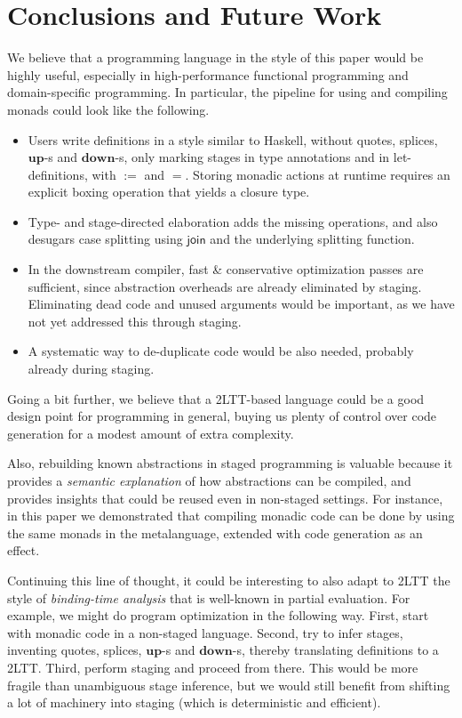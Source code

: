 \documentclass[acmsmall,screen]{acmart}
\newcommand{\mit}[1]{{\mathsf{#1}}}
\newcommand{\mbf}[1]{{\mathbf{#1}}}
\theoremstyle{remark}
\newcommand{\mup}{\mbf{up}}
\newcommand{\mdown}{\mbf{down}}
\newcommand{\join}{\mit{join}}
\begin{document}
\section{Conclusions and Future Work}

We believe that a programming language in the style of this paper would be
highly useful, especially in high-performance functional programming and
domain-specific programming. In particular, the pipeline for using and compiling
monads could look like the following.
\begin{itemize}
\item Users write definitions in a style similar to Haskell, without quotes,
      splices, $\mup$-s and $\mdown$-s, only marking stages in type annotations and
      in let-definitions, with $:=$ and $=$.  Storing monadic actions at runtime
      requires an explicit boxing operation that yields a closure type.
\item Type- and stage-directed elaboration adds the missing operations, and also desugars
      case splitting using $\join$ and the underlying splitting function.
\item In the downstream compiler, fast \& conservative optimization passes are
      sufficient, since abstraction overheads are already eliminated by staging. Eliminating
      dead code and unused arguments would be important, as we have not yet addressed
      this through staging.
\item A systematic way to de-duplicate code would be also needed, probably already
      during staging.
\end{itemize}

Going a bit further, we believe that a 2LTT-based language could be a good design point
for programming in general, buying us plenty of control over code generation for
a modest amount of extra complexity.

Also, rebuilding known abstractions in staged programming is valuable because it
provides a \emph{semantic explanation} of how abstractions can be compiled, and
provides insights that could be reused even in non-staged settings. For
instance, in this paper we demonstrated that compiling monadic code can be done
by using the same monads in the metalanguage, extended with code
generation as an effect.

Continuing this line of thought, it could be interesting to also adapt to 2LTT
the style of \emph{binding-time analysis} that is well-known in partial
evaluation. For example, we might do program optimization in the following way.
First, start with monadic code in a non-staged language. Second, try to infer
stages, inventing quotes, splices, $\mup$-s and $\mdown$-s, thereby translating
definitions to a 2LTT. Third, perform staging and proceed from there. This would
be more fragile than unambiguous stage inference, but we would still benefit from
shifting a lot of machinery into staging (which is deterministic and efficient).
\end{document}
